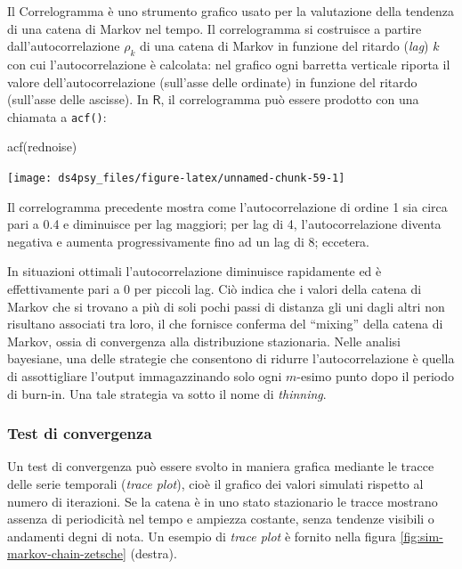 \documentclass[
  11pt,
]{krantz}
\makeatletter
\newenvironment{Shaded}{\begin{snugshade}}{\end{snugshade}}
\newcommand{\FunctionTok}[1]{\textcolor[rgb]{0,0,0}{#1}}
\newcommand{\NormalTok}[1]{#1}
\newenvironment{kframe}{%
\medskip{}
\setlength{\fboxsep}{.8em}
 \def\at@end@of@kframe{}%
 \ifinner\ifhmode%
  \def\at@end@of@kframe{\end{minipage}}%
  \begin{minipage}{\columnwidth}%
 \fi\fi%
 \def\FrameCommand##1{\hskip\@totalleftmargin \hskip-\fboxsep
 \colorbox{shadecolor}{##1}\hskip-\fboxsep
     \hskip-\linewidth \hskip-\@totalleftmargin \hskip\columnwidth}%
 \MakeFramed {\advance\hsize-\width
   \@totalleftmargin\z@ \linewidth\hsize
   \@setminipage}}%
 {\par\unskip\endMakeFramed%
 \at@end@of@kframe}
\renewenvironment{Shaded}{\begin{kframe}}{\end{kframe}}
\newcommand{\R}{\textsf{R}} %
\theoremstyle{definition}
\theoremstyle{definition}
\theoremstyle{definition}
\theoremstyle{definition}
\theoremstyle{remark}
\makeatother
\begin{document}
Il Correlogramma è uno strumento grafico usato per la valutazione della tendenza di una catena di Markov nel tempo. Il correlogramma si costruisce a partire dall'autocorrelazione \(\rho_k\) di una catena di Markov in funzione del ritardo (\emph{lag}) \(k\) con cui l'autocorrelazione è calcolata: nel grafico ogni barretta verticale riporta il valore dell'autocorrelazione (sull'asse delle ordinate) in funzione del ritardo (sull'asse delle ascisse). In \(\R\), il correlogramma può essere prodotto con una chiamata a \texttt{acf()}:

\begin{Shaded}
\begin{Highlighting}[]
\FunctionTok{acf}\NormalTok{(rednoise)}
\end{Highlighting}
\end{Shaded}

\begin{center}\texttt{[image: ds4psy\_files/figure-latex/unnamed-chunk-59-1]} \end{center}

Il correlogramma precedente mostra come l'autocorrelazione di ordine 1 sia circa pari a 0.4 e diminuisce per lag maggiori; per lag di 4, l'autocorrelazione diventa negativa e aumenta progressivamente fino ad un lag di 8; eccetera.

In situazioni ottimali l'autocorrelazione diminuisce rapidamente ed è effettivamente pari a 0 per piccoli lag. Ciò indica che i valori della catena di Markov che si trovano a più di soli pochi passi di distanza gli uni dagli altri non risultano associati tra loro, il che fornisce conferma del ``mixing'' della catena di Markov, ossia di convergenza alla distribuzione stazionaria. Nelle analisi bayesiane, una delle strategie che consentono di ridurre l'autocorrelazione è quella di assottigliare l'output immagazzinando solo ogni \(m\)-esimo punto dopo il periodo di burn-in. Una tale strategia va sotto il nome di \emph{thinning}.

\hypertarget{test-di-convergenza}{%
\subsubsection{Test di convergenza}\label{test-di-convergenza}}

Un test di convergenza può essere svolto in maniera grafica mediante le tracce delle serie temporali (\emph{trace plot}), cioè il grafico dei valori simulati rispetto al numero di iterazioni. Se la catena è in uno stato stazionario le tracce mostrano assenza di periodicità nel tempo e ampiezza costante, senza tendenze visibili o andamenti degni di nota. Un esempio di \emph{trace plot} è fornito nella figura \ref{fig:sim-markov-chain-zetsche} (destra).
\end{document}
